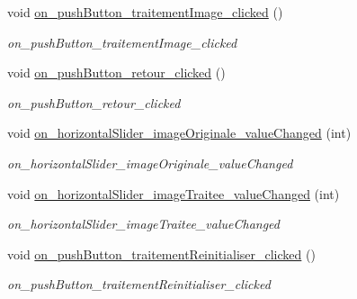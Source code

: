 \begin{DoxyCompactItemize}
void \hyperlink{classMainWindow_adf60caef775208cb39eff294981c9e88}{on\+\_\+push\+Button\+\_\+traitement\+Image\+\_\+clicked} ()
\begin{DoxyCompactList}\small\item\em on\+\_\+push\+Button\+\_\+traitement\+Image\+\_\+clicked \end{DoxyCompactList}\item 
\mbox{\label{classMainWindow_aec65250d1c32225746ec18aa394a943f}} 
void \hyperlink{classMainWindow_aec65250d1c32225746ec18aa394a943f}{on\+\_\+push\+Button\+\_\+retour\+\_\+clicked} ()
\begin{DoxyCompactList}\small\item\em on\+\_\+push\+Button\+\_\+retour\+\_\+clicked \end{DoxyCompactList}\item 
\mbox{\label{classMainWindow_aa9835b27970c4d853eda5430f168145f}} 
void \hyperlink{classMainWindow_aa9835b27970c4d853eda5430f168145f}{on\+\_\+horizontal\+Slider\+\_\+image\+Originale\+\_\+value\+Changed} (int)
\begin{DoxyCompactList}\small\item\em on\+\_\+horizontal\+Slider\+\_\+image\+Originale\+\_\+value\+Changed \end{DoxyCompactList}\item 
\mbox{\label{classMainWindow_aa02bacdc44ef7bf15d0ed596a08c30a7}} 
void \hyperlink{classMainWindow_aa02bacdc44ef7bf15d0ed596a08c30a7}{on\+\_\+horizontal\+Slider\+\_\+image\+Traitee\+\_\+value\+Changed} (int)
\begin{DoxyCompactList}\small\item\em on\+\_\+horizontal\+Slider\+\_\+image\+Traitee\+\_\+value\+Changed \end{DoxyCompactList}\item 
\mbox{\label{classMainWindow_a13a2050ed2e2434b34f8e78917782680}} 
void \hyperlink{classMainWindow_a13a2050ed2e2434b34f8e78917782680}{on\+\_\+push\+Button\+\_\+traitement\+Reinitialiser\+\_\+clicked} ()
\begin{DoxyCompactList}\small\item\em on\+\_\+push\+Button\+\_\+traitement\+Reinitialiser\+\_\+clicked \end{DoxyCompactList}\item 

\end{DoxyCompactItemize}
